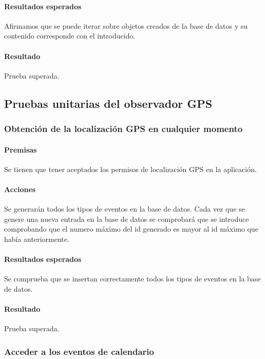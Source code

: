 \paragraph{Resultados esperados}

Afirmamos que se puede iterar sobre objetos creados de la base de datos y su contenido corresponde con el introducido.

\paragraph{Resultado}
Prueba superada.

\subsection{Pruebas unitarias del observador GPS}

\subsubsection{Obtención de la localización GPS en cualquier momento}

\paragraph{Premisas}
Se tienen que tener aceptados los permisos de localización GPS en la aplicación.


\paragraph{Acciones}
Se generarán todos los tipos de eventos en la base de datos.
Cada vez que se genere una nueva entrada en la base de datos se comprobará que se introduce comprobando que el numero máximo del id generado es mayor al id máximo que había anteriormente.

\paragraph{Resultados esperados}

Se comprueba que se insertan correctamente todos los tipos de eventos en la base de datos.

\paragraph{Resultado}
Prueba superada.

\subsubsection{Acceder a los eventos de calendario}


